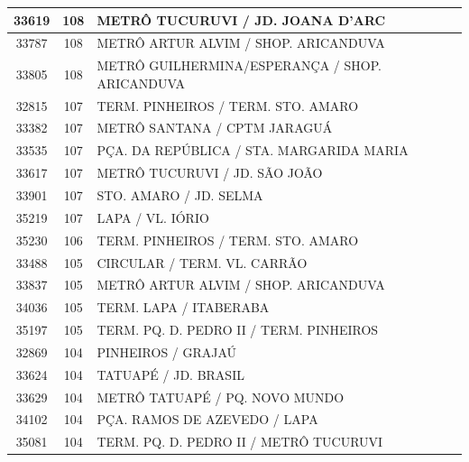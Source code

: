 \documentclass[
	12pt,				%
	oneside,			%
	a4paper,			%
	english,			%
	brazil				%
	]{abntex2ppgsi}
\begin{document}
\begin{apendicesenv}
\begin{longtable}{c|c|p{7cm}}
    33619 & 108   & METRÔ TUCURUVI / JD. JOANA D'ARC \\
\hline

    33787 & 108   & METRÔ ARTUR ALVIM / SHOP. ARICANDUVA \\
\hline

    33805 & 108   & METRÔ GUILHERMINA/ESPERANÇA / SHOP. ARICANDUVA \\
\hline

    32815 & 107   & TERM. PINHEIROS / TERM. STO. AMARO \\
\hline

    33382 & 107   & METRÔ SANTANA / CPTM JARAGUÁ \\
\hline

    33535 & 107   & PÇA. DA REPÚBLICA / STA. MARGARIDA MARIA \\
\hline

    33617 & 107   & METRÔ TUCURUVI / JD. SÃO JOÃO \\
\hline

    33901 & 107   & STO. AMARO / JD. SELMA \\
\hline

    35219 & 107   & LAPA / VL. IÓRIO \\
\hline

    35230 & 106   & TERM. PINHEIROS / TERM. STO. AMARO \\
\hline

    33488 & 105   & CIRCULAR / TERM. VL. CARRÃO \\
\hline

    33837 & 105   & METRÔ ARTUR ALVIM / SHOP. ARICANDUVA \\
\hline

    34036 & 105   & TERM. LAPA / ITABERABA \\
\hline

    35197 & 105   & TERM. PQ. D. PEDRO II / TERM. PINHEIROS \\
\hline

    32869 & 104   & PINHEIROS / GRAJAÚ \\
\hline

    33624 & 104   & TATUAPÉ / JD. BRASIL \\
\hline

    33629 & 104   & METRÔ TATUAPÉ / PQ. NOVO MUNDO \\
\hline

    34102 & 104   & PÇA. RAMOS DE AZEVEDO / LAPA \\
\hline

    35081 & 104   & TERM. PQ. D. PEDRO II / METRÔ TUCURUVI \\
\hline


\end{longtable}
\end{apendicesenv}
\end{document}
